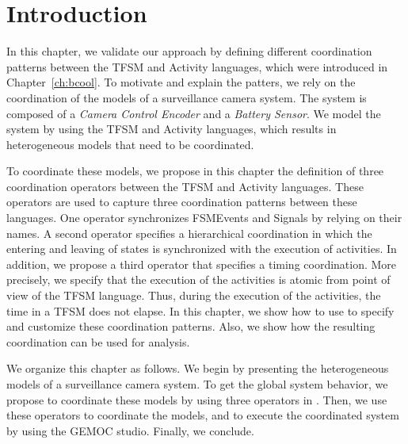 \section{Introduction}
In this chapter, we validate our approach by defining different coordination patterns between the TFSM and Activity languages, which were introduced in Chapter~\ref{ch:bcool}. To motivate and explain the patters, we rely on the coordination of the models of a surveillance camera system. The system is composed of a \emph{Camera Control Encoder} and a \emph{Battery Sensor}. We model the system by using the TFSM and Activity languages, which results in heterogeneous models that need to be coordinated. 
	
To coordinate these models, we propose in this chapter the definition of three \bcool coordination operators between the TFSM and Activity languages. These operators are used to capture three coordination patterns between these languages. One operator synchronizes FSMEvents and Signals by relying on their names. A second operator specifies a hierarchical coordination in which the entering and leaving of states is synchronized with the execution of activities. In addition, we propose a third operator that specifies a timing coordination. More precisely, we specify that the execution of the activities is atomic from point of view of the TFSM language. Thus, during the execution of the activities, the time in a TFSM does not elapse. In this chapter, we show how to use \bcool to specify and customize these coordination patterns. Also, we show how the resulting coordination can be used for analysis.
		
We organize this chapter as follows. We begin by presenting the heterogeneous models of a surveillance camera system. To get the global system behavior, we propose to coordinate these models by using three operators in \bcool. Then, we use these operators to coordinate the models, and to execute the coordinated system by using the GEMOC studio. Finally, we conclude.
		

